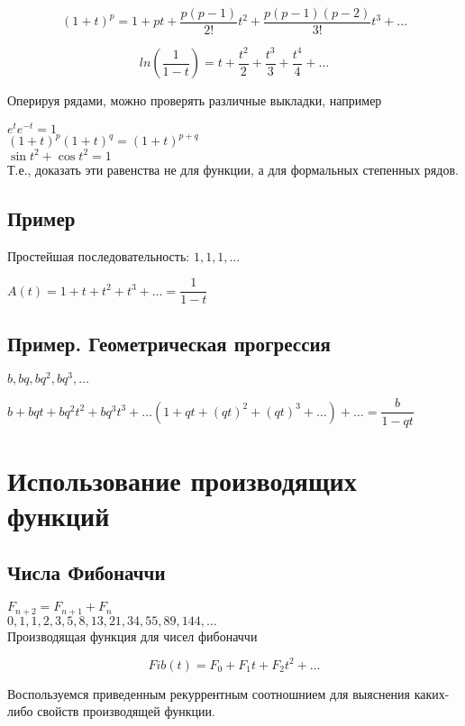 $$
(1+t)^p = 1 + pt + \frac{p(p-1)}{2!}t^{2} + \frac{p(p-1)(p-2)}{3!}t^{3} + \ldots
$$

$$
ln( \dfrac{1}{1-t}) = t + \dfrac{t^{2}}{2}+ \dfrac{t^{3}}{3} + \dfrac{t^{4}}{4} + \ldots
$$

Оперируя рядами, можно проверять различные выкладки, например 

$ e^{t} e^{-t} = 1 $ \\
$(1+t)^p(1+t)^q = (1+t)^{p+q}$ \\
$\sin{t}^2 + \cos{t}^2 = 1$ \\

Т.е., доказать эти равенства не для функции, а для формальных степенных рядов.

\subsection{Пример}

Простейшая последовательность: 
$1,1,1,\ldots$

$A(t) = 1+t+t^{2}+t^{3}+ \ldots = \dfrac{1}{1-t}$

\subsection{Пример. Геометрическая прогрессия}

$b,bq,bq^{2},bq^{3},\ldots$

$b + bqt + bq^2t^2 + bq^3t^3 + \ldots (1 + qt + (qt)^2 + (qt)^3 + \ldots) + \ldots 
= \dfrac{b}{1 - qt}$

\section{Использование производящих функций}

\subsection{Числа Фибоначчи}

$F_{n+2} = F_{n+1} + F_{n}$ \\
$0,1,1,2,3,5,8,13,21,34,55,89,144, \ldots$ \\

Производящая функция для чисел фибоначчи

\begin{equation}
\label{fib1}
Fib(t) = F_0 +  F_1 t + F_2 t^2 + \ldots
\end{equation}

Воспользуемся приведенным рекуррентным соотношнием для выяснения 
каких-либо свойств производящей функции.

